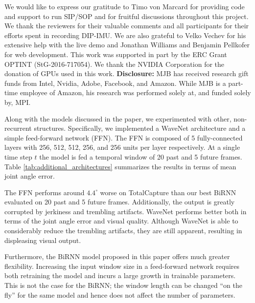 \documentclass[acmtog]{acmart}
\begin{document}
\begin{acks}
We would like to express our gratitude to Timo von Marcard for providing code and support to run SIP/SOP and for fruitful discussions throughout this project. We thank the reviewers for their valuable comments and all participants for their efforts spent in recording DIP-IMU. We are also grateful to Velko Vechev for his extensive help with the live demo and Jonathan Williams and Benjamin Pellkofer for web development. This work was supported in part by the ERC Grant OPTINT (StG-2016-717054). We thank the NVIDIA Corporation for the donation of GPUs used in this work.
\textbf{Disclosure:} MJB has received research gift funds from Intel, Nvidia, Adobe, Facebook, and Amazon.  While MJB is a part-time employee of Amazon, his research was performed solely at, and funded solely by, MPI.
\end{acks}




Along with the models discussed in the paper, we experimented with other, non-recurrent structures. Specifically, we implemented a WaveNet architecture \cite{oord2016wavenet} and a simple feed-forward network (FFN). The FFN is composed of 5 fully-connected layers with 256, 512, 512, 256, and 256 units per layer respectively. At a single time step $t$ the model is fed a temporal window of 20 past and 5 future frames. Table \ref{tab:additional_architectures} summarizes the results in terms of mean joint angle error.

The FFN performs around $4.4^\circ$ worse on TotalCapture than our best BiRNN evaluated on 20 past and 5 future frames. Additionally, the output is greatly corrupted by jerkiness and trembling artifacts. WaveNet performs better both in terms of the joint angle error and visual quality. Although WaveNet is able to considerably reduce the trembling artifacts, they are still apparent, resulting in displeasing visual output.

Furthermore, the BiRNN model proposed in this paper offers much greater flexibility. Increasing the input window size in a feed-forward network requires both retraining the model and incurs a large growth in trainable parameters. This is not the case for the BiRNN; the window length can be changed ``on the fly'' for the same model and hence does not affect the number of parameters.
\end{document}
